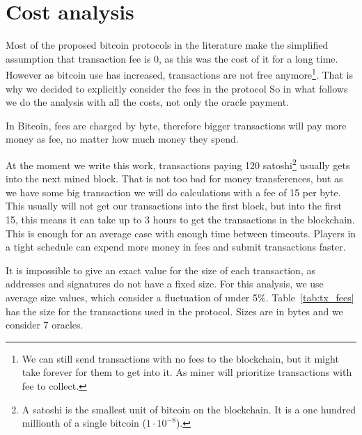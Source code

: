 \section {Cost analysis} \label{sec:cost_analysis}
\newcommand\numoracles[0]{7}%
\newcommand\feeval[0]{15}%
\newcommand\bitcoinusd[0]{3800}%
\newcommand\txcost[2]{\calculatecosts{#1}{#2}{\numoracles{}}{\feeval{}}}%
\newcommand\usdcost[1]{\satoshitousd{#1}{\bitcoinusd{}}}%

Most of the proposed bitcoin protocols in the literature make the simplified
  assumption that transaction fee is 0, as this was the cost of it for a long
  time.
However as bitcoin use has increased, transactions are not free
  anymore\footnote{We can still send transactions with no fees to the
    blockchain, but it might take forever for them to get into it. As miner will
    prioritize transactions with fee to collect.}.
That is why we decided to explicitly consider the fees in the protocol
So in what follows we do the analysis with all the costs, not only the oracle
  payment.

In Bitcoin, fees are charged by byte, therefore bigger transactions will pay more
  money as fee, no matter how much money they spend.

At the moment we write this work, transactions paying 120 satoshi\footnote{A
  satoshi is the smallest unit of bitcoin on the blockchain. It is a one hundred
  millionth of a single bitcoin ($1 \cdot 10^{-8}$).} usually gets into the next
  mined block.
That is not too bad for money transferences, but as we have some big transaction
  we will do calculations with a fee of \feeval{} per byte.
This usually will not get our transactions into the first block, but into the
  first 15, this means it can take up to 3 hours to get the transactions in
  the blockchain.
This is enough for an average case with enough time between timeouts.
Players in a tight schedule can expend more money in fees and submit
  transactions faster.

It is impossible to give an exact value for the size of each transaction, as
  addresses and signatures do not have a fixed size.
For this analysis, we use average size values, which consider a fluctuation of
  under 5\%.
Table~\ref{tab:tx_fees} has the size for the transactions used in the protocol.
Sizes are in bytes and we consider \numoracles{} oracles.

